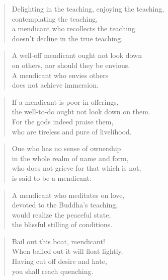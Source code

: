 \documentclass[12pt,openany]{book}%
\begin{document}
\begin{verse}%
Delighting in the teaching, enjoying the teaching, \\
contemplating the teaching, \\
a mendicant who recollects the teaching \\
doesn’t decline in the true teaching. 

%
\end{verse}

\begin{verse}%
A well-off mendicant ought not look down \\
on others, nor should they be envious. \\
A mendicant who envies others \\
does not achieve immersion. 

%
\end{verse}

\begin{verse}%
If a mendicant is poor in offerings, \\
the well-to-do ought not look down on them. \\
For the gods indeed praise them, \\
who are tireless and pure of livelihood. 

%
\end{verse}

\begin{verse}%
One who has no sense of ownership \\
in the whole realm of name and form, \\
who does not grieve for that which is not, \\
is said to be a mendicant. 

%
\end{verse}

\begin{verse}%
A mendicant who meditates on love, \\
devoted to the Buddha’s teaching, \\
would realize the peaceful state, \\
the blissful stilling of conditions. 

%
\end{verse}

\begin{verse}%
Bail out this boat, mendicant! \\
When bailed out it will float lightly. \\
Having cut off desire and hate, \\
you shall reach quenching. 

%
\end{verse}
\end{document}
